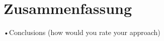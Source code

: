 \documentclass[liststotoc,11pt,a4paper]{article}
\begin{document}
\section{Zusammenfassung}
•Conclusions (how would you rate your approach)


\newpage
{}	%
\setcounter{page}{3}
\renewcommand{\refname}{Referenzen}


\end{document}
